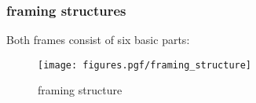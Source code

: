 \subsubsection{framing structures}
\label{module:framing:frames:structures}
Both frames consist of six basic parts:


% 
%
\begin{figure}
\centering
  \texttt{[image: figures.pgf/framing\_structure]}
\caption{framing structure}
\label{fig:module:framing:structure}
\end{figure}


